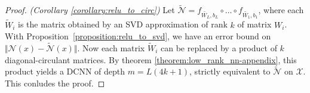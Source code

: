 \begin{proof} \emph{(Corollary \ref{corollary:relu_to_circ})}
Let $\tilde{\mathcal{N}}=f_{\tilde{W_{L}},b_{L}}\circ\ldots\circ f_{\tilde{W_{1}},b_{1}}$, where each $\tilde{W}_{i}$ is the matrix obtained by an SVD approximation of rank $k$ of matrix $W_{i}$.
With Proposition~\ref{proposition:relu_to_svd}, we have an error bound on $\Vert \mathcal{N}\left(x\right)-\tilde{\mathcal{N}}\left(x\right)\Vert $.
Now each matrix $\tilde{W}_{i}$ can be replaced by a product of $k$ diagonal-circulant matrices.
By theorem \ref{theorem:low_rank_nn-appendix}, this product yields a DCNN of depth $m = L(4k+1)$, strictly equivalent to $\tilde{\mathcal{N}}$ on $\mathcal{X}$.
This conludes the proof.
\end{proof}



